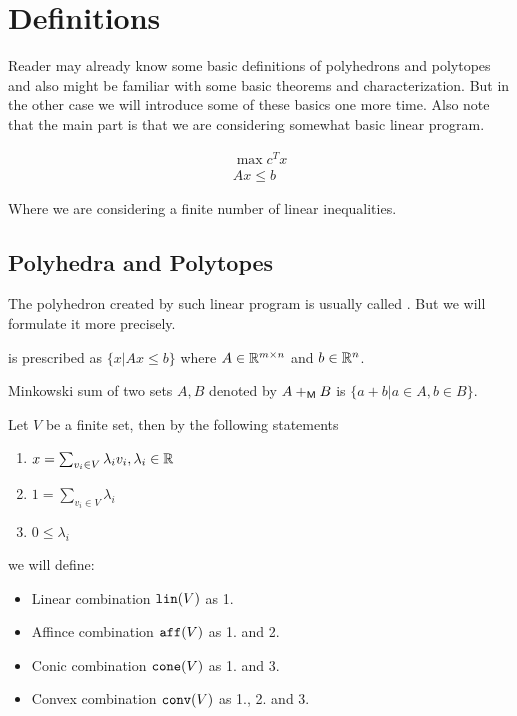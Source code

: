 \chapter{Definitions}

Reader may already know some basic definitions of polyhedrons and polytopes and also might be familiar with some basic theorems and characterization. But in the other case we will introduce some of these basics one more time. Also note that the main part is that we are considering somewhat basic linear program.

$$
\begin{aligned}
	\max c^{T} x \\
	A x \leq b
\end{aligned}
$$

\noindent Where we are considering a finite number of linear inequalities.

\section{Polyhedra and Polytopes}

The polyhedron created by such linear program is usually called . But we will formulate it more precisely.

\begin{defn}
	 is prescribed as $\{x | A x \leq b\}$ where $A \in \mathbb{R}^{m \times n}$ and $b \in \mathbb{R}^{n}$.
\end{defn}

\begin{defn}
	Minkowski sum of two sets $A,B$ denoted by $A +_{\mathsf{M}} B$ is $\{a + b | a \in A, b \in B\}$.
\end{defn}

\begin{defn}[Combinations]
	Let $V$ be a finite set, then by the following statements

	\begin{enumerate}
			\item $x = \sum_{v_{i} \in V} \lambda_{i} v_{i}, \lambda_{i} \in \mathbb{R}${}
			\item $1 = \sum_{v_{i} \in V} \lambda_{i}$
			\item $0 \leq \lambda_{i}$
	\end{enumerate}

	\noindent we will define:

	\begin{itemize}
			\item Linear combination $\mathtt{lin}(V)$ as 1.
			\item Affince combination $\mathtt{aff}(V)$ as 1. and 2.
			\item Conic combination $\mathtt{cone}(V)$ as 1. and 3.
			\item Convex combination $\mathtt{conv}(V)$ as 1., 2. and 3.
	\end{itemize}
\end{defn}

